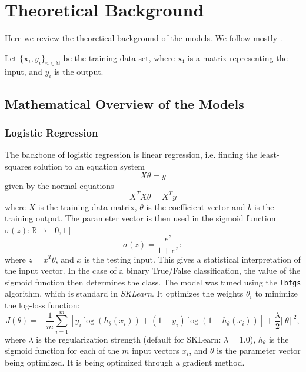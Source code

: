 
\section{Theoretical Background}

Here we review the theoretical background of the models. We follow mostly \cite{lindholm2022machine}.

Let $\{ \boldsymbol{x}_i, y_i \}_{n \in \mathbb{N}}$ be the training data set, where $\boldsymbol{x_i}$ is a matrix representing the input, and $y_i$ is the  output.

\subsection{Mathematical Overview of the Models}

    \subsubsection{Logistic Regression}
    The backbone of logistic regression is linear regression, i.e. finding the least-squares solution to an equation system 
    \begin{equation*}
        X\theta = y
    \end{equation*}
    given by the normal equations 
    \begin{equation*}
        X^TX \theta = X^Ty
    \end{equation*}
    where $X$ is the training data matrix, $\theta$ is the coefficient vector and $b$ is the training output. The parameter vector is then used in the sigmoid function $\sigma(z): \mathbb{R}\to [0,1]$
    \begin{equation*}
        \sigma(z) = \frac{e^{z}}{1+e^{z}}:
    \end{equation*}
    where $  z = x^T \theta$, and $x$ is the testing input. This gives a statistical interpretation of the input vector. In the case of a binary True/False classification, the value of the sigmoid function then determines the class. The model was tuned using the \texttt{lbfgs} algorithm, which is standard in \emph{SKLearn}. It optimizes the weights  $\theta_i$ to minimize the log-loss function: 
    \begin{equation}
        J(\theta) = - \frac{1}{m} \sum_{i=1}^{m} \left[ y_i \log(h_\theta(x_i)) + (1 - y_i) \log(1 - h_\theta(x_i)) \right] + \frac{\lambda}{2} ||\theta||^2,
    \end{equation}
    where $\lambda$ is the regularization strength (default for SKLearn: $\lambda = 1.0$), $h_\theta$ is the sigmoid function for each of the $m$ input vectors $x_i$, and $\theta$ is the parameter vector being optimized. It is being optimized through a gradient method.
    
